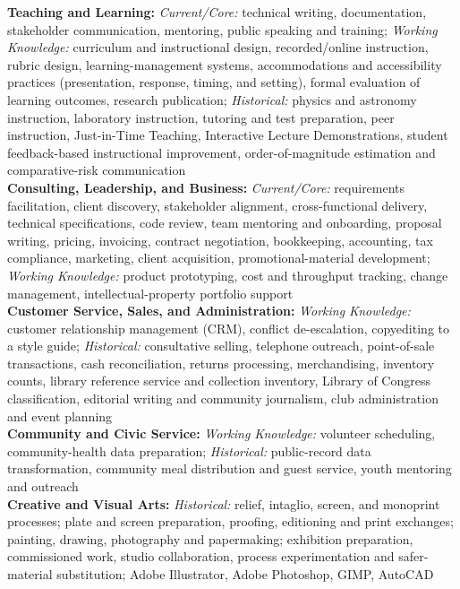 \textbf{Teaching and Learning:} \textit{Current/Core:} technical writing, documentation, stakeholder communication, mentoring, public speaking and training; \textit{Working Knowledge:} curriculum and instructional design, recorded/online instruction, rubric design, learning-management systems, accommodations and accessibility practices (presentation, response, timing, and setting), formal evaluation of learning outcomes, research publication; \textit{Historical:} physics and astronomy instruction, laboratory instruction, tutoring and test preparation, peer instruction, Just-in-Time Teaching, Interactive Lecture Demonstrations, student feedback-based instructional improvement, order-of-magnitude estimation and comparative-risk communication\\
\textbf{Consulting, Leadership, and Business:} \textit{Current/Core:} requirements facilitation, client discovery, stakeholder alignment, cross-functional delivery, technical specifications, code review, team mentoring and onboarding, proposal writing, pricing, invoicing, contract negotiation, bookkeeping, accounting, tax compliance, marketing, client acquisition, promotional-material development; \textit{Working Knowledge:} product prototyping, cost and throughput tracking, change management, intellectual-property portfolio support\\
\textbf{Customer Service, Sales, and Administration:} \textit{Working Knowledge:} customer relationship management (CRM), conflict de-escalation, copyediting to a style guide; \textit{Historical:} consultative selling, telephone outreach, point-of-sale transactions, cash reconciliation, returns processing, merchandising, inventory counts, library reference service and collection inventory, Library of Congress classification, editorial writing and community journalism, club administration and event planning\\
\textbf{Community and Civic Service:} \textit{Working Knowledge:} volunteer scheduling, community-health data preparation; \textit{Historical:} public-record data transformation, community meal distribution and guest service, youth mentoring and outreach\\
\textbf{Creative and Visual Arts:} \textit{Historical:} relief, intaglio, screen, and monoprint processes; plate and screen preparation, proofing, editioning and print exchanges; painting, drawing, photography and papermaking; exhibition preparation, commissioned work, studio collaboration, process experimentation and safer-material substitution; Adobe Illustrator, Adobe Photoshop, GIMP, AutoCAD\\
